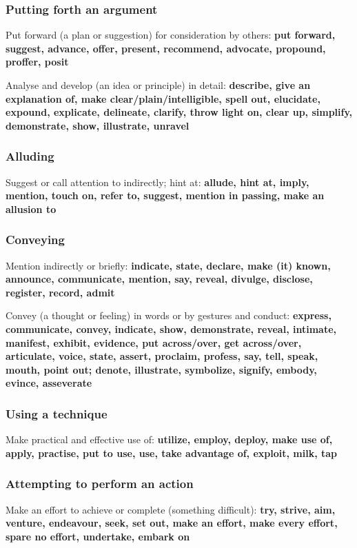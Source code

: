 \subsubsection{Putting forth an argument}
Put forward (a plan or suggestion) for consideration by others: \textbf{put forward, suggest, advance, offer, present, recommend, advocate, propound, proffer, posit}

Analyse and develop (an idea or principle) in detail: \textbf{describe, give an explanation of, make clear/plain/intelligible, spell out, elucidate, expound, explicate, delineate, clarify, throw light on, clear up, simplify, demonstrate, show, illustrate, unravel}

\subsubsection{Alluding}
Suggest or call attention to indirectly; hint at: \textbf{allude, hint at, imply, mention, touch on, refer to, suggest, mention in passing, make an allusion to}

\subsubsection{Conveying}
Mention indirectly or briefly: \textbf{indicate, state, declare, make (it) known, announce, communicate, mention, say, reveal, divulge, disclose, register, record, admit}

Convey (a thought or feeling) in words or by gestures and conduct: \textbf{express, communicate, convey, indicate, show, demonstrate, reveal, intimate, manifest, exhibit, evidence, put across/over, get across/over, articulate, voice, state, assert, proclaim, profess, say, tell, speak, mouth, point out; denote, illustrate, symbolize, signify, embody, evince, asseverate}

\subsubsection{Using a technique}
Make practical and effective use of: \textbf{utilize, employ, deploy, make use of, apply, practise, put to use, use, take advantage of, exploit, milk, tap}

\subsubsection{Attempting to perform an action}
Make an effort to achieve or complete (something difficult):
\textbf{try, strive, aim, venture, endeavour, seek, set out, make an effort, make every effort, spare no effort, undertake, embark on}

